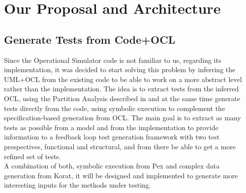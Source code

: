 \chapter{Our Proposal and Architecture}
\minitoc
{}

\section{Generate Tests from Code+OCL}\label{proposal}
Since the Operational Simulator code is not familiar to us, regarding its implementation, it was decided to start solving this problem by inferring the UML+OCL from the existing code
to be able to work on a more abstract level rather than the implementation.
The idea is to extract tests from the inferred OCL, using the Partition Analysis described
in \cite{Benattou02generatingtest} and at the same time generate tests directly from the code, using symbolic execution to complement
the specification-based generation from OCL. The main goal is to extract as many tests as possible from a model and from the implementation 
to provide information to a feedback loop\cite{Xie03mutuallyenhancing}
test generation framework with two test prespectives, functional and structural, and from there be able to get a more refined set of tests.\\
A combination of both, symbolic execution from Pex and complex data generation from Korat, it will be designed and implemented to
generate more interesting inputs for the methods under testing.

